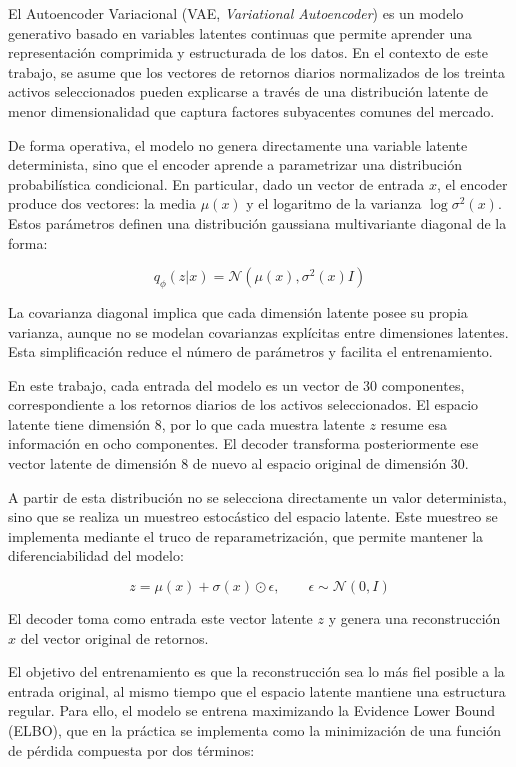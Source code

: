 El Autoencoder Variacional (VAE, \textit{Variational Autoencoder}) es un modelo generativo basado en variables latentes continuas que permite aprender una representación comprimida y estructurada de los datos. En el contexto de este trabajo, se asume que los vectores de retornos diarios normalizados de los treinta activos seleccionados pueden explicarse a través de una distribución latente de menor dimensionalidad que captura factores subyacentes comunes del mercado.

De forma operativa, el modelo no genera directamente una variable latente determinista, sino que el encoder aprende a parametrizar una distribución probabilística condicional. En particular, dado un vector de entrada \(x\), el encoder produce dos vectores: la media \(\mu(x)\) y el logaritmo de la varianza \(\log \sigma^2(x)\). Estos parámetros definen una distribución gaussiana multivariante diagonal de la forma:

\[
q_\phi(z|x) = \mathcal{N}(\mu(x), \sigma^2(x) I)
\]

La covarianza diagonal implica que cada dimensión latente posee su propia varianza, aunque no se modelan covarianzas explícitas entre dimensiones latentes. Esta simplificación reduce el número de parámetros y facilita el entrenamiento.

En este trabajo, cada entrada del modelo es un vector de 30 componentes, correspondiente a los retornos diarios de los activos seleccionados. El espacio latente tiene dimensión 8, por lo que cada muestra latente \(z\) resume esa información en ocho componentes. El decoder transforma posteriormente ese vector latente de dimensión 8 de nuevo al espacio original de dimensión 30.

A partir de esta distribución no se selecciona directamente un valor determinista, sino que se realiza un muestreo estocástico del espacio latente. Este muestreo se implementa mediante el truco de reparametrización, que permite mantener la diferenciabilidad del modelo:

\[
z = \mu(x) + \sigma(x) \odot \epsilon,
\qquad \epsilon \sim \mathcal{N}(0,I)
\]

El decoder toma como entrada este vector latente \(z\) y genera una reconstrucción \(\hat{x}\) del vector original de retornos.

El objetivo del entrenamiento es que la reconstrucción sea lo más fiel posible a la entrada original, al mismo tiempo que el espacio latente mantiene una estructura regular. Para ello, el modelo se entrena maximizando la Evidence Lower Bound (ELBO), que en la práctica se implementa como la minimización de una función de pérdida compuesta por dos términos:

